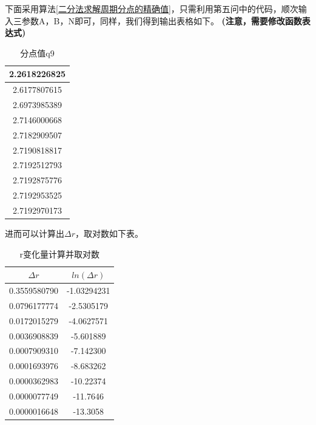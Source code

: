 \documentclass[10pt, a4paper]{article}
\begin{document}
    下面采用算法\ref{二分法求解周期分点的精确值}，只需利用第五问中的代码，顺次输入三参数A，B，N即可，同样，我们得到输出表格如下。
    \textbf{(注意，需要修改函数表达式)}
    \begin{table}[H]
        \centering
        \caption{分点值q9}
        \begin{tabular}{c}\hline
        2.2618226825 \\\hline
        2.6177807615 \\\hline
        2.6973985389 \\\hline
        2.7146000668 \\\hline
        2.7182909507 \\\hline
        2.7190818817 \\\hline
        2.7192512793 \\\hline
        2.7192875776 \\\hline
        2.7192953525 \\\hline
        2.7192970173 \\\hline
        \end{tabular}%
        \label{tab:分点值q9}%
    \end{table}%
  
    进而可以计算出$\Delta r$，取对数如下表。

    \begin{table}[H]
        \centering
        \caption{r变化量计算并取对数}
        \begin{tabular}{|c|c|}\hline
            $\Delta r$&$ln(\Delta r)$ \\\hline
        0.3559580790  & -1.03294231 \\\hline
        0.0796177774  & -2.5305179 \\\hline
        0.0172015279  & -4.0627571 \\\hline
        0.0036908839  & -5.601889 \\\hline
        0.0007909310  & -7.142300 \\\hline
        0.0001693976  & -8.683262 \\\hline
        0.0000362983  & -10.22374 \\\hline
        0.0000077749  & -11.7646 \\\hline
        0.0000016648  & -13.3058 \\\hline
        \end{tabular}%
        \label{tab:r变化量计算并取对数}%
    \end{table}%
    
\end{document}
